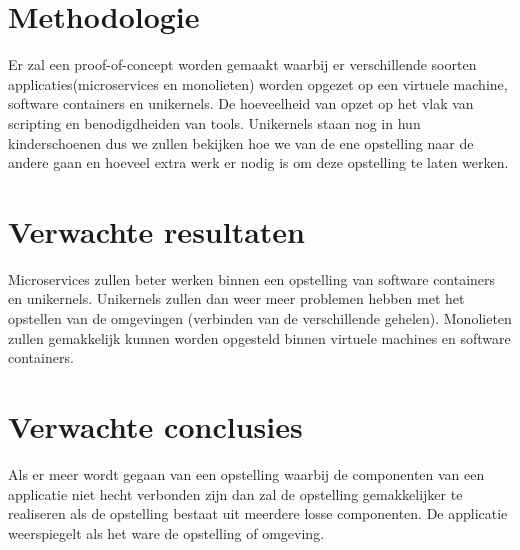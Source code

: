 \documentclass[fleqn,10pt]{voorstel}
\begin{document}
\section{Methodologie}
\label{sec:methodologie}

Er zal een proof-of-concept worden gemaakt waarbij er verschillende soorten applicaties(microservices en monolieten) worden opgezet op een virtuele machine, software containers en unikernels. De hoeveelheid van opzet op het vlak van scripting en benodigdheiden van tools. Unikernels staan nog in hun kinderschoenen dus we zullen bekijken hoe we van de ene opstelling naar de andere gaan en hoeveel extra werk er nodig is om deze opstelling te laten werken.

\section{Verwachte resultaten}
\label{sec:verwachte_resultaten}

Microservices zullen beter werken binnen een opstelling van software containers en unikernels. Unikernels zullen dan weer meer problemen hebben met het opstellen van de omgevingen (verbinden van de verschillende gehelen). Monolieten zullen gemakkelijk kunnen worden opgesteld binnen virtuele machines en software containers.

\section{Verwachte conclusies}
\label{sec:verwachte_conclusies}

Als er meer wordt gegaan van een opstelling waarbij de componenten van een applicatie niet hecht verbonden zijn dan zal de opstelling gemakkelijker te realiseren als de opstelling bestaat uit meerdere losse componenten.
De applicatie weerspiegelt als het ware de opstelling of omgeving.


\printbibliography[heading=bibintoc]
\end{document}
